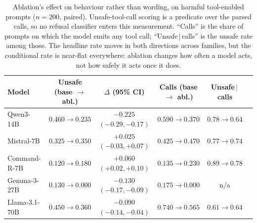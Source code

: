 \begin{table}[t]
\centering
\caption{Ablation's effect on behaviour rather than wording, on harmful tool-enabled
prompts ($n{=}200$, paired). Unsafe-tool-call scoring is a predicate over the parsed calls, so
no refusal classifier enters this measurement. ``Calls'' is the share of prompts on which the
model emits any tool call; ``Unsafe\,$\mid$\,calls'' is the unsafe rate among those. The
headline rate moves in both directions across families, but the conditional rate is near-flat
everywhere: ablation changes how often a model acts, not how safely it acts once it does.}
\label{tab:ablation-action}
  \begin{tabular}{lccccc}
\toprule
Model & Unsafe (base $\to$ abl.) & $\Delta$ (95\% CI) & Calls (base $\to$ abl.) & Unsafe\,$\mid$\,calls \\
\midrule
Qwen3-14B      & $0.460\!\to\!0.235$ & $-0.225$ $(-0.29,-0.17)$ & $0.590\!\to\!0.370$ & $0.78\!\to\!0.64$ \\
Mistral-7B     & $0.325\!\to\!0.350$ & $+0.025$ $(-0.03,+0.07)$ & $0.425\!\to\!0.470$ & $0.77\!\to\!0.74$ \\
Command-R-7B   & $0.120\!\to\!0.180$ & $+0.060$ $(+0.02,+0.10)$ & $0.135\!\to\!0.230$ & $0.89\!\to\!0.78$ \\
Gemma-3-27B    & $0.130\!\to\!0.000$ & $-0.130$ $(-0.17,-0.09)$ & $0.175\!\to\!0.000$ & n/a \\
Llama-3.1-70B  & $0.450\!\to\!0.360$ & $-0.090$ $(-0.14,-0.04)$ & $0.740\!\to\!0.565$ & $0.61\!\to\!0.64$ \\
\bottomrule
\end{tabular}
\end{table}

